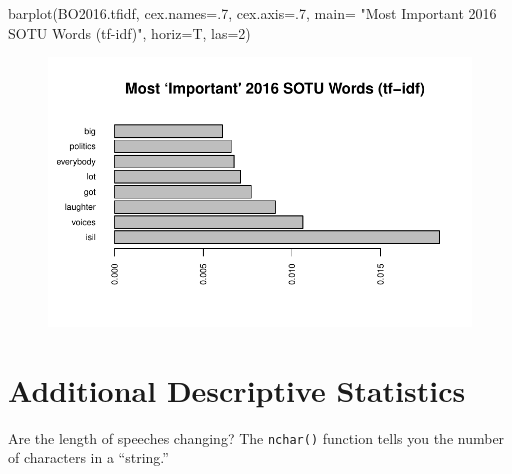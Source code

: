 \documentclass[
  letterpaper,
  DIV=11,
  numbers=noendperiod]{scrreprt}
\newenvironment{Shaded}{\begin{snugshade}}{\end{snugshade}}
\newcommand{\AttributeTok}[1]{\textcolor[rgb]{0.40,0.45,0.13}{#1}}
\newcommand{\DecValTok}[1]{\textcolor[rgb]{0.68,0.00,0.00}{#1}}
\newcommand{\FunctionTok}[1]{\textcolor[rgb]{0.28,0.35,0.67}{#1}}
\newcommand{\NormalTok}[1]{\textcolor[rgb]{0.00,0.23,0.31}{#1}}
\newcommand{\OtherTok}[1]{\textcolor[rgb]{0.00,0.23,0.31}{#1}}
\newcommand{\SpecialCharTok}[1]{\textcolor[rgb]{0.37,0.37,0.37}{#1}}
\newcommand{\StringTok}[1]{\textcolor[rgb]{0.13,0.47,0.30}{#1}}
\begin{document}
\begin{Shaded}
\begin{Highlighting}[]
\FunctionTok{barplot}\NormalTok{(BO2016.tfidf,}
         \AttributeTok{cex.names=}\NormalTok{.}\DecValTok{7}\NormalTok{, }\AttributeTok{cex.axis=}\NormalTok{.}\DecValTok{7}\NormalTok{,}
        \AttributeTok{main=} \StringTok{"Most \textasciigrave{}Important\textquotesingle{} 2016 SOTU Words (tf{-}idf)"}\NormalTok{, }
        \AttributeTok{horiz=}\NormalTok{T, }\AttributeTok{las=}\DecValTok{2}\NormalTok{)}
\end{Highlighting}
\end{Shaded}

\begin{figure}[H]

{\centering \includegraphics{11-TextasData_files/figure-pdf/unnamed-chunk-15-2.pdf}

}

\end{figure}

\hypertarget{additional-descriptive-statistics}{%
\section{Additional Descriptive
Statistics}\label{additional-descriptive-statistics}}

Are the length of speeches changing? The \texttt{nchar()} function tells
you the number of characters in a ``string.''

\begin{Shaded}
\end{Shaded}
\end{document}
